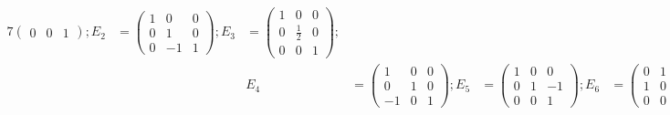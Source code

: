 \begin{Exercise}
\begin{solution}
\begin{alignat*}{7}
\begin{pmatrix}
		0 & 0 & 1
		\end{pmatrix}; E_2 &= \begin{pmatrix}
		1 & 0 & 0 \\
		0 & 1 & 0 \\
		0 & -1 & 1
		\end{pmatrix}; E_3 &= \begin{pmatrix}
		1 & 0 & 0 \\
		0 & \frac{1}{2} & 0 \\
		0 & 0 & 1
		\end{pmatrix}; \\
		\quad&& E_4 &= \begin{pmatrix}
		1 & 0 & 0 \\
		0 & 1 & 0 \\
		-1 & 0 & 1
		\end{pmatrix}; E_5 &= \begin{pmatrix}
		1 & 0 & 0 \\
		0 & 1 & -1 \\
		0 & 0 & 1
		\end{pmatrix}; E_6 &= \begin{pmatrix}
		0 & 1 & 0 \\
		1 & 0 & 0 \\
		0 & 0 & 1
		\end{pmatrix}.
		\end{alignat*}
		

\end{solution}
\end{Exercise}

